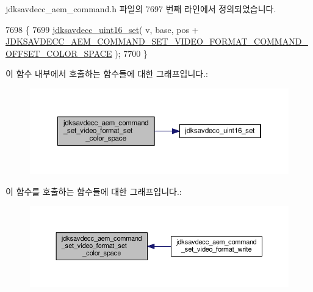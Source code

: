jdksavdecc\+\_\+aem\+\_\+command.\+h 파일의 7697 번째 라인에서 정의되었습니다.


\begin{DoxyCode}
7698 \{
7699     \hyperlink{group__endian_ga14b9eeadc05f94334096c127c955a60b}{jdksavdecc\_uint16\_set}( v, base, pos + 
      \hyperlink{group__command__set__video__format_ga0a0155ed7a4b18e4825cc4c078901cf2}{JDKSAVDECC\_AEM\_COMMAND\_SET\_VIDEO\_FORMAT\_COMMAND\_OFFSET\_COLOR\_SPACE}
       );
7700 \}
\end{DoxyCode}


이 함수 내부에서 호출하는 함수들에 대한 그래프입니다.\+:
\nopagebreak
\begin{figure}[H]
\begin{center}
\leavevmode
\includegraphics[width=350pt]{group__command__set__video__format_ga918350cb09aa3b735368efbb398f62b3_cgraph}
\end{center}
\end{figure}




이 함수를 호출하는 함수들에 대한 그래프입니다.\+:
\nopagebreak
\begin{figure}[H]
\begin{center}
\leavevmode
\includegraphics[width=350pt]{group__command__set__video__format_ga918350cb09aa3b735368efbb398f62b3_icgraph}
\end{center}
\end{figure}


